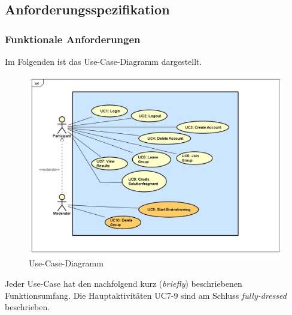 \subsection{Anforderungsspezifikation}

\subsubsection{Funktionale Anforderungen}

Im Folgenden ist das Use-Case-Diagramm dargestellt.
\begin{figure}[h]
	\centering
	\includegraphics[width=1\linewidth]{img/anforderungen/UC-Methode635}
	\caption{Use-Case-Diagramm}
	\label{fig:ucmethode-635}
\end{figure}

Jeder Use-Case hat den nachfolgend kurz (\textit{briefly}) beschriebenen  Funktionsumfang. Die Hauptaktivitäten UC7-9 sind am Schluss \textit{fully-dressed} beschrieben.

